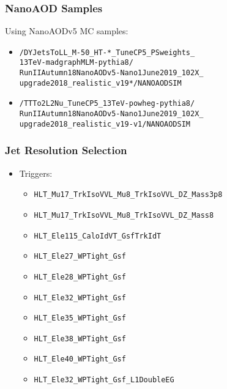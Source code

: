 \documentclass{beamer}
\begin{document}
\begin{frame}
  \frametitle{NanoAOD Samples}

  Using NanoAODv5 MC samples:

  \begin{itemize}
  \item \texttt{\small /DYJetsToLL\_M-50\_HT-*\_TuneCP5\_PSweights\_\\13TeV-madgraphMLM-pythia8/\\RunIIAutumn18NanoAODv5-Nano1June2019\_102X\_\\upgrade2018\_realistic\_v19*/NANOAODSIM}
  \item \texttt{\small /TTTo2L2Nu\_TuneCP5\_13TeV-powheg-pythia8/\\RunIIAutumn18NanoAODv5-Nano1June2019\_102X\_\\upgrade2018\_realistic\_v19-v1/NANOAODSIM}
  \end{itemize}

\end{frame}

\begin{frame}
  \frametitle{Jet Resolution Selection}

  \begin{itemize}
  \item Triggers:
    \begin{itemize}
    \item \texttt{HLT\_Mu17\_TrkIsoVVL\_Mu8\_TrkIsoVVL\_DZ\_Mass3p8}
    \item \texttt{HLT\_Mu17\_TrkIsoVVL\_Mu8\_TrkIsoVVL\_DZ\_Mass8}
    \item \texttt{HLT\_Ele115\_CaloIdVT\_GsfTrkIdT}
    \item \texttt{HLT\_Ele27\_WPTight\_Gsf}
    \item \texttt{HLT\_Ele28\_WPTight\_Gsf}
    \item \texttt{HLT\_Ele32\_WPTight\_Gsf}
    \item \texttt{HLT\_Ele35\_WPTight\_Gsf}
    \item \texttt{HLT\_Ele38\_WPTight\_Gsf}
    \item \texttt{HLT\_Ele40\_WPTight\_Gsf}
    \item \texttt{HLT\_Ele32\_WPTight\_Gsf\_L1DoubleEG}
    \end{itemize}
  \end{itemize}

\end{frame}
\end{document}
